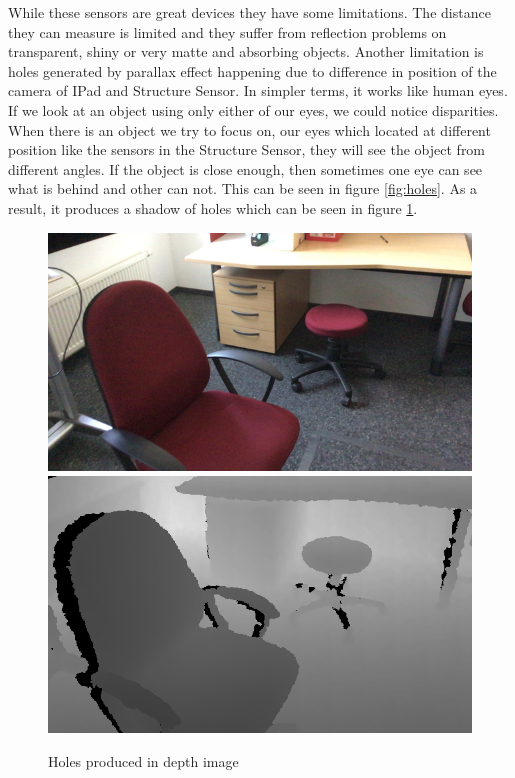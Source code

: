 While these sensors are great devices they have some limitations. The distance they can measure is limited and they suffer from reflection problems on transparent, shiny or very matte and absorbing objects. Another limitation is holes generated by parallax effect happening due to difference in position of the camera of IPad and Structure Sensor\cite{Kalantari}. In simpler terms, it works like human eyes. If we look at an object using only either of our eyes, we could notice disparities. When there is an object we try to focus on, our eyes which located at different position like the sensors in the Structure Sensor, they will see the object from different angles. If the object is close enough, then sometimes one eye can see what is behind and other can not. This can be seen in figure \ref{fig:holes}. As a result, it produces a shadow of holes which can be seen in figure \ref{fig:holes2}.



\begin{figure}[h]
    \includegraphics[scale=0.29]{Figures/RGB.png} \includegraphics[scale=0.37]{Figures/Depth.png}
    \caption{Holes produced in depth image}
    \label{fig:holes2}
\end{figure}


